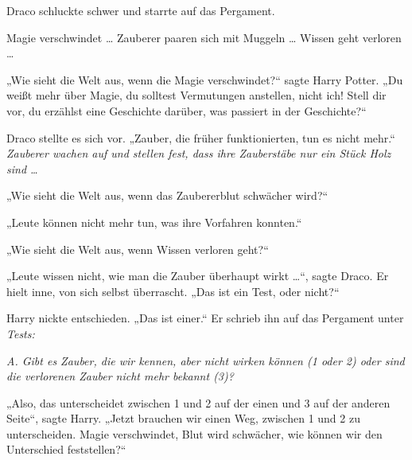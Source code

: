 Draco schluckte schwer und starrte auf das Pergament.

Magie verschwindet … Zauberer paaren sich mit Muggeln … Wissen geht verloren …

„Wie sieht die Welt aus, wenn die Magie verschwindet?“ sagte Harry Potter.
„Du weißt mehr über Magie, du solltest Vermutungen anstellen, nicht ich! Stell dir vor, du erzählst eine Geschichte darüber, was passiert in der Geschichte?“

Draco stellte es sich vor.
„Zauber, die früher funktionierten, tun es nicht mehr.“ \emph{Zauberer wachen auf und stellen fest, dass ihre Zauberstäbe nur ein Stück Holz sind …}

„Wie sieht die Welt aus, wenn das Zaubererblut schwächer wird?“

„Leute können nicht mehr tun, was ihre Vorfahren konnten.“

„Wie sieht die Welt aus, wenn Wissen verloren geht?“

„Leute wissen nicht, wie man die Zauber überhaupt wirkt …“, sagte Draco. Er hielt inne, von sich selbst überrascht.
„Das ist ein Test, oder nicht?“

Harry nickte entschieden.
„Das ist einer.“ Er schrieb ihn auf das Pergament unter \emph{Tests:}

\emph{A. Gibt es Zauber, die wir kennen, aber nicht wirken können (1 oder 2) oder sind die verlorenen Zauber nicht mehr bekannt (3)?}

„Also, das unterscheidet zwischen 1 und 2 auf der einen und 3 auf der anderen Seite“, sagte Harry.
„Jetzt brauchen wir einen Weg, zwischen 1 und 2 zu unterscheiden. Magie verschwindet, Blut wird schwächer, wie können wir den Unterschied feststellen?“

